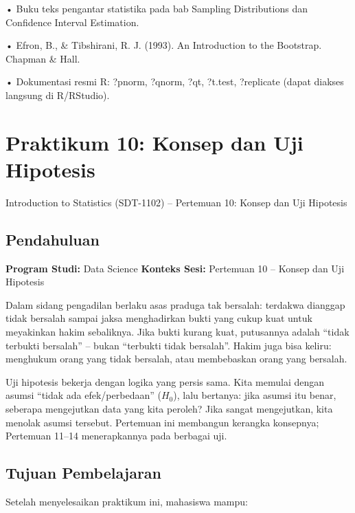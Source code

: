 \documentclass[
  indonesian,
  letterpaper,
]{book}
\begin{document}
• Buku teks pengantar statistika pada bab Sampling Distributions dan
Confidence Interval Estimation.

• Efron, B., \& Tibshirani, R. J. (1993). An Introduction to the
Bootstrap. Chapman \& Hall.

• Dokumentasi resmi R: ?pnorm, ?qnorm, ?qt, ?t.test, ?replicate (dapat
diakses langsung di R/RStudio).


\chapter{Praktikum 10: Konsep dan Uji
Hipotesis}\label{praktikum-10-konsep-dan-uji-hipotesis}

Introduction to Statistics (SDT-1102) -- Pertemuan 10: Konsep dan Uji
Hipotesis

\hfill\break

\section{Pendahuluan}\label{pendahuluan}

\textbf{Program Studi:} Data Science \textbf{Konteks Sesi:} Pertemuan 10
-- Konsep dan Uji Hipotesis

Dalam sidang pengadilan berlaku asas praduga tak bersalah: terdakwa
dianggap tidak bersalah sampai jaksa menghadirkan bukti yang cukup kuat
untuk meyakinkan hakim sebaliknya. Jika bukti kurang kuat, putusannya
adalah ``tidak terbukti bersalah'' -- bukan ``terbukti tidak bersalah''.
Hakim juga bisa keliru: menghukum orang yang tidak bersalah, atau
membebaskan orang yang bersalah.

Uji hipotesis bekerja dengan logika yang persis sama. Kita memulai
dengan asumsi ``tidak ada efek/perbedaan'' (\(H_0\)), lalu bertanya:
jika asumsi itu benar, seberapa mengejutkan data yang kita peroleh? Jika
sangat mengejutkan, kita menolak asumsi tersebut. Pertemuan ini
membangun kerangka konsepnya; Pertemuan 11--14 menerapkannya pada
berbagai uji.

\section{Tujuan Pembelajaran}\label{tujuan-pembelajaran}

Setelah menyelesaikan praktikum ini, mahasiswa mampu:
\end{document}
